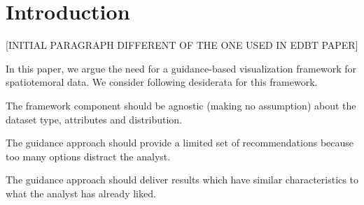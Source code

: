 \documentclass[conference]{IEEEtran}
\begin{document}
\IEEEpeerreviewmaketitle

\vspace{-5pt}
\section{Introduction} 

[INITIAL PARAGRAPH DIFFERENT OF THE ONE USED IN EDBT PAPER]



In this paper, we argue the need for a guidance-based visualization framework for spatiotemoral data. We consider following desiderata for this framework.

 The framework component should be agnostic (making no assumption) about the dataset type, attributes and distribution.

 The guidance approach should provide a limited set of recommendations because too many options distract the analyst. \cite{miller1956human}

 The guidance approach should deliver results which have similar characteristics to what the analyst has already liked.
\end{document}
